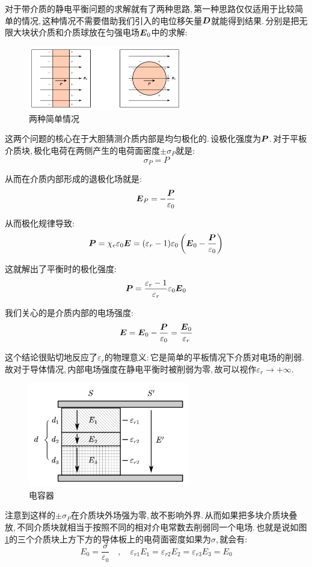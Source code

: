 对于带介质的静电平衡问题的求解就有了两种思路,\,第一种思路仅仅适用于比较简单的情况,\,这种情况不需要借助我们引入的电位移矢量$\boldsymbol{D}$就能得到结果.\,分别是把无限大块状介质和介质球放在匀强电场$\boldsymbol{E}_0$中的求解:

\begin{figure}[H]
\centering
\includegraphics[width=0.6\textwidth]{image/7-2-12.png}
\caption{两种简单情况}
\end{figure}

这两个问题的核心在于大胆猜测介质内部是均匀极化的.\,设极化强度为$\boldsymbol{P}$.\,对于平板介质块,\,极化电荷在两侧产生的电荷面密度$\pm \sigma_P$就是:
\[\sigma_P=P\]

从而在介质内部形成的退极化场就是:
\[\boldsymbol{E}_P=-\frac{\boldsymbol{P}}{\varepsilon_0}\]

从而极化规律导致:
\[\boldsymbol{P}=\chi_e \varepsilon_0 \boldsymbol{E}=(\varepsilon_r-1)\varepsilon_0\left( \boldsymbol{E}_0 -\frac{\boldsymbol{P}}{\varepsilon_0}\right)\]

这就解出了平衡时的极化强度:
\[\boldsymbol{P}=\frac{\varepsilon_r-1}{\varepsilon_r}\varepsilon_0 \boldsymbol{E}_0\]

我们关心的是介质内部的电场强度:
\[\boldsymbol{E}=\boldsymbol{E}_0 -\frac{\boldsymbol{P}}{\varepsilon_0}=\frac{ \boldsymbol{E}_0}{\varepsilon_r}\]

这个结论很贴切地反应了$\varepsilon_r$的物理意义:\,它是简单的平板情况下介质对电场的削弱.\,故对于导体情况,\,内部电场强度在静电平衡时被削弱为零,\,故可以视作$\varepsilon_r\to +\infty$.

\begin{figure}
\vspace{-0.2cm}
\centering
\includegraphics[width=7cm]{image/7-2-13.png}
\caption{电容器}\label{fig7-2-13}
\end{figure}
注意到这样的$\pm\sigma_P$在介质块外场强为零,\,故不影响外界.\,从而如果把多块介质块叠放,\,不同介质块就相当于按照不同的相对介电常数去削弱同一个电场.\,也就是说如图\ref{fig7-2-13}的三个介质块上方下方的导体板上的电荷面密度如果为$\sigma$,\,就会有:
\[E_0=\frac{\sigma}{\varepsilon_0}\quad ,\quad \varepsilon_{r1}E_1=\varepsilon_{r2}E_2=\varepsilon_{r3}E_3=E_0\]

